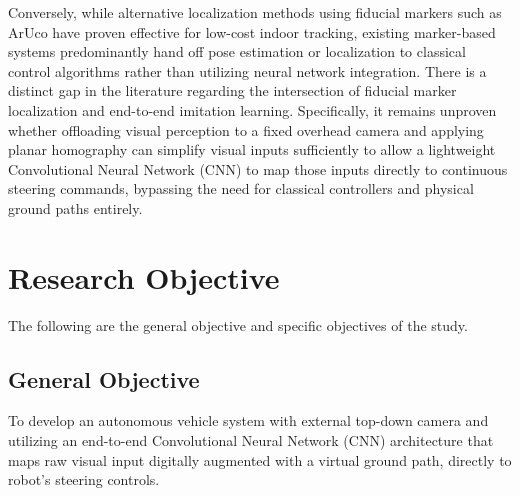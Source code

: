 Conversely, while alternative localization methods using fiducial markers such as ArUco have proven effective for low-cost indoor tracking, existing marker-based systems predominantly hand off pose estimation or localization to classical control algorithms rather than utilizing neural network integration. There is a distinct gap in the literature regarding the intersection of fiducial marker localization and end-to-end imitation learning. Specifically, it remains unproven whether offloading visual perception to a fixed overhead camera and applying planar homography can simplify visual inputs sufficiently to allow a lightweight Convolutional Neural Network (CNN) to map those inputs directly to continuous steering commands, bypassing the need for classical controllers and physical ground paths entirely.

\section{Research Objective} 
The following are the general objective and specific objectives of the study.

\subsection{General Objective}
To develop an autonomous vehicle system with external top-down camera and utilizing an end-to-end Convolutional Neural Network (CNN) architecture that maps raw visual input digitally augmented with a virtual ground path, directly to robot’s steering controls.

